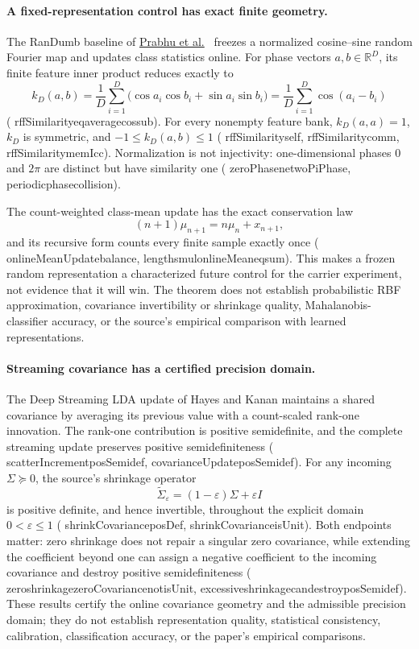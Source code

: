 \documentclass[11pt]{article}
\newcommand{\leanname}[1]{{\scriptsize\ttfamily
  \def\_{\textunderscore\allowbreak}#1}}
\begin{document}
\paragraph{A fixed-representation control has exact finite geometry.}
The RanDumb baseline of
\href{https://arxiv.org/abs/2402.08823}{Prabhu et
al.}~\cite{prabhu2024random} freezes a normalized cosine--sine random
Fourier map and updates class statistics online. For phase vectors
$a,b\in\mathbb{R}^{D}$, its finite feature inner product reduces exactly to
\[
 k_D(a,b)=\frac1D\sum_{i=1}^{D}
   \bigl(\cos a_i\cos b_i+\sin a_i\sin b_i\bigr)
 =\frac1D\sum_{i=1}^{D}\cos(a_i-b_i)
\]
(\leanname{rffSimilarity\_eq\_average\_cos\_sub}). For every nonempty
feature bank, $k_D(a,a)=1$, $k_D$ is symmetric, and
$-1\le k_D(a,b)\le1$
(\leanname{rffSimilarity\_self},
\leanname{rffSimilarity\_comm},
\leanname{rffSimilarity\_mem\_Icc}). Normalization is not injectivity:
one-dimensional phases $0$ and $2\pi$ are distinct but have similarity one
(\leanname{zeroPhase\_ne\_twoPiPhase},
\leanname{periodic\_phase\_collision}).

The count-weighted class-mean update has the exact conservation law
\[
 (n+1)\mu_{n+1}=n\mu_n+x_{n+1},
\]
and its recursive form counts every finite sample exactly once
(\leanname{onlineMeanUpdate\_balance},
\leanname{length\_smul\_onlineMean\_eq\_sum}). This makes a frozen random
representation a characterized future control for the carrier experiment,
not evidence that it will win. The theorem does not establish probabilistic
RBF approximation, covariance invertibility or shrinkage quality,
Mahalanobis-classifier accuracy, or the source's empirical comparison with
learned representations.

\paragraph{Streaming covariance has a certified precision domain.}
The Deep Streaming LDA update of Hayes and Kanan
\cite{hayes2020slda} maintains a shared covariance by averaging its previous
value with a count-scaled rank-one innovation. The rank-one contribution is
positive semidefinite, and the complete streaming update preserves positive
semidefiniteness
(\leanname{scatterIncrement\_posSemidef},
\leanname{covarianceUpdate\_posSemidef}). For any incoming
$\Sigma\succeq0$, the source's shrinkage operator
\[
  \widetilde{\Sigma}_{\varepsilon}
  =(1-\varepsilon)\Sigma+\varepsilon I
\]
is positive definite, and hence invertible, throughout the explicit domain
$0<\varepsilon\le1$
(\leanname{shrinkCovariance\_posDef},
\leanname{shrinkCovariance\_isUnit}). Both endpoints matter: zero shrinkage
does not repair a singular zero covariance, while extending the coefficient
beyond one can assign a negative coefficient to the incoming covariance and
destroy positive semidefiniteness
(\leanname{zero\_shrinkage\_zeroCovariance\_not\_isUnit},
\leanname{excessive\_shrinkage\_can\_destroy\_posSemidef}).
These results certify the online covariance geometry and the admissible
precision domain; they do not establish representation quality, statistical
consistency, calibration, classification accuracy, or the paper's empirical
comparisons.
\end{document}
